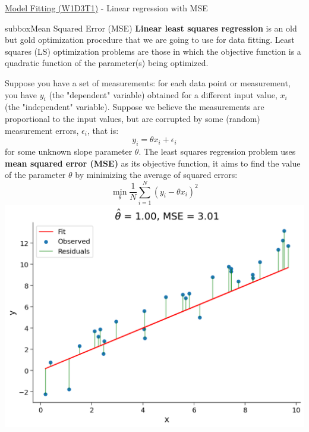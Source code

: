 \begin{textbox}{\href{https://compneuro.neuromatch.io/tutorials/W1D3_ModelFitting/chapter_title.html}{Model Fitting (W1D3T1)} -  Linear regression with MSE}
\begin{subbox}{subbox}{Mean Squared Error (MSE)}
\scriptsize
\textbf{Linear least squares regression} is an old but gold  optimization procedure that we are going to use for data fitting. Least squares (LS) optimization problems are those in which the objective function is a quadratic function of the
parameter(s) being optimized.

Suppose you have a set of measurements: for each data point or measurement, you have $y_{i}$ (the "dependent" variable) obtained for a different input value, $x_{i}$ (the "independent" variable).  Suppose we believe the measurements are proportional to the input values, but are corrupted by some (random) measurement errors, $\epsilon_{i}$, that is:
\begin{equation}
y_{i}= \theta x_{i}+\epsilon_{i}
\end{equation}
for some unknown slope parameter $\theta.$ The least squares regression problem uses \textbf{mean squared error (MSE)} as its objective function, it aims to find the value of the parameter $\theta$ by minimizing the average of squared errors:
\begin{equation}
\min _{\theta} \frac{1}{N}\sum_{i=1}^{N}\left(y_{i}-\theta x_{i}\right)^{2}
\end{equation}
\centering
\includegraphics[scale=0.2]{Figures/ModelFitting/MFFigure1.png}
\end{subbox}

\end{textbox}
